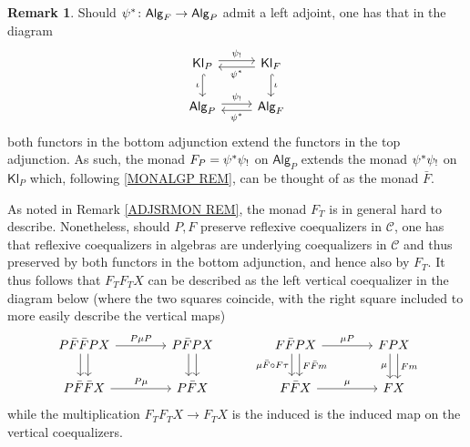 \documentclass[a4paper,10pt
,draft
]{article}%
\numberwithin{equation}{section}
\numberwithin{figure}{section}
\theoremstyle{definition} %
\newtheorem{remark}[equation]{Remark}%
\newcommand{\Alg}{\mathsf{Alg}}
\newcommand{\Kl}{\mathsf{Kl}}
\newcommand{\1}{\ensuremath{\mathbbm 1}}%
\begin{document}
\begin{remark}
Should $\psi^{\**}\colon \Alg_F \to \Alg_P$ admit a left adjoint, 
one has that in the diagram
\begin{equation}\label{PARTADJDB EQ}
\begin{tikzcd}
	\mathsf{Kl}_{P} 
	\ar[shift left=0.25em]{r}{\psi_!} 
	\ar[hookrightarrow]{d}[swap]{\iota}
&
	\mathsf{Kl}_{F} 
	\ar[shift left=0.25em]{l}{\psi^{\**}}
	\ar[hookrightarrow]{d}{\iota}
\\
	\mathsf{Alg}_{P} 
	\ar[shift left=0.25em]{r}{\psi_!} &
	\mathsf{Alg}_{F}
	\ar[shift left=0.25em]{l}{\psi^{\**}}
\end{tikzcd}
\end{equation}
both functors in the bottom adjunction
extend the functors in the top adjunction.
As such, the monad
$F_P = \psi^{\**} \psi_!$ on $\Alg_P$
extends the monad $\psi^{\**} \psi_!$ on $\Kl_P$ which, 
following \ref{MONALGP REM}, can be thought of as the monad $\bar{F}$.

As noted in Remark \ref{ADJSRMON REM}, the monad $F_T$ is in general hard to describe. 
Nonetheless, should $P,F$ preserve reflexive coequalizers in $\mathcal{C}$,
one has that reflexive coequalizers in algebras
are underlying coequalizers in $\mathcal{C}$
\cite[Thm. 5.6.5]{Ri17}
and thus preserved by both functors in the bottom adjunction, and hence also by $F_T$.
It thus follows that $F_TF_TX$
can be described as the left vertical coequalizer in the diagram below 
(where the two squares coincide, 
with the right square included to more easily describe the vertical maps) 
\begin{equation}\label{FRMONDES EQ}
\begin{tikzcd}[column sep =40pt]
	P \bar{F}\bar{F} P X
	\ar[shift left=.3em]{d}{}
	\ar[shift right=.3em]{d}[swap]{}
	\ar{r}{P\mu P}
&
	P \bar{F} P X
	\ar[shift left=.3em]{d}{}
	\ar[shift right=.3em]{d}[swap]{}
&%
	F\bar{F} P X
	\ar[shift left=.3em]{d}{F\bar{F} m}
	\ar[shift right=.3em]{d}[swap]{\mu\bar{F} \circ F\tau}
	\ar{r}{\mu P}
&
	F P X
	\ar[shift left=.3em]{d}{F m}
	\ar[shift right=.3em]{d}[swap]{\mu}
\\
	P \bar{F}\bar{F} X
	\ar{r}{P\mu}
&
	P \bar{F} X
&%
	F\bar{F} X
	\ar{r}{\mu}
&
	F X
\end{tikzcd}
\end{equation}
while the multiplication $F_TF_TX \to F_TX$
is the induced is the induced map on the vertical coequalizers.
\end{remark}
\end{document}
